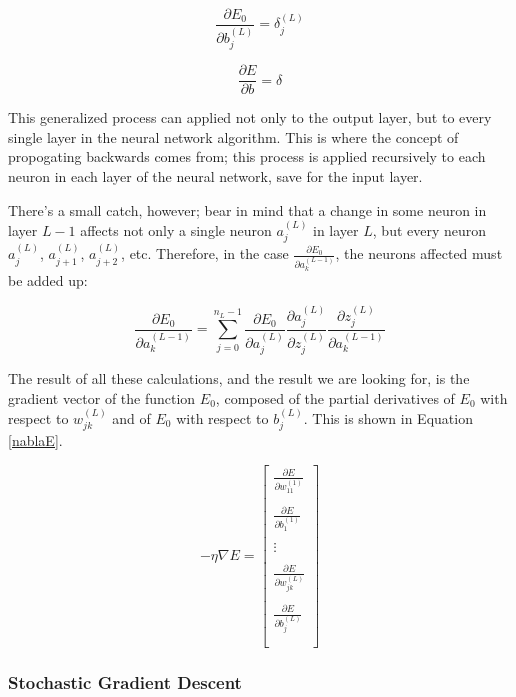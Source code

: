 \documentclass[12pt]{article}
\begin{document}
\[ \frac{\partial E_0}{\partial b_j^{(L)}} = \delta_j^{(L)}\]

\begin{equation} \label{general-delta-dEB}
    \frac{\partial E}{\partial b} = \delta
\end{equation}


This generalized process can applied not only to the output layer, but to every single layer in the neural network algorithm. This is where the concept of propogating backwards comes from; this process is applied recursively to each neuron in each layer of the neural network, save for the input layer.

There's a small catch, however; bear in mind that a change in some neuron in layer $L-1$ affects not only a single neuron $a_j^{(L)}$ in layer $L$, but every neuron $a_j^{(L)}$, $a_{j+1}^{(L)}$, $a_{j+2}^{(L)}$, etc. Therefore, in the case $ \frac{\partial E_0}{\partial a_k^{(L-1)}} $, the neurons affected must be added up:

\[ \frac{\partial E_0}{\partial a_k^{(L-1)}} = \sum_{j=0}^{n_L-1} \frac{\partial E_0}{\partial a_j^{(L)}}  \frac{\partial a_j^{(L)}}{\partial z_j^{(L)}} \frac{\partial z_j^{(L)}}{\partial a_k^{(L-1)}} \]

The result of all these calculations, and the result we are looking for, is the gradient vector of the function $E_0$, composed of the partial derivatives of $E_0$ with respect to $w_{jk}^{(L)}$ and of $E_0$ with respect to $b_j^{(L)}$. This is shown in Equation \ref{nablaE}.


\begin{equation} \label{nablaE}
    -\eta \nabla E = \begin{bmatrix}
        \frac{\partial E}{\partial w_{11}^{(1)}} \\\\
        \frac{\partial E}{\partial b_1^{(1)}}    \\\\
        \vdots                                   \\\\
        \frac{\partial E}{\partial w_{jk}^{(L)}} \\\\
        \frac{\partial E}{\partial b_j^{(L)}}    \\\\
    \end{bmatrix}
\end{equation}

\subsubsection{Stochastic Gradient Descent}
\end{document}
